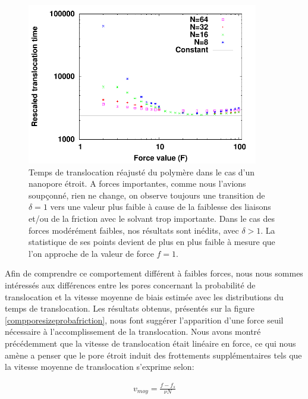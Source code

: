 \begin{figure}[H]
\begin{center}
\includegraphics[width=0.9\textwidth]{sptransloctaufresc.pdf}
\caption[Temps de translocations réajustés (avec $\alpha=1.73$) du polymère structuré et pore étroit]{Temps de translocation réajusté du polymère dans le cas d'un nanopore étroit. A forces importantes, comme nous l'avions soupçonné, rien ne change, on observe toujours une transition de $\delta=1$ vers une valeur plus faible à cause de la faiblesse des liaisons et/ou de la friction avec le solvant trop importante. Dans le cas des forces modérément faibles, nos résultats sont inédits, avec $\delta>1$. La statistique de ses points devient de plus en plus faible à mesure que l'on approche de la valeur de force $f=1$.}
\label{sptransloctaufresc}
\end{center}
\end{figure}

Afin de comprendre ce comportement différent à faibles forces, nous nous sommes intéressés aux différences entre les pores concernant la probabilité de translocation et la vitesse moyenne de biais estimée avec les distributions du temps de translocation. Les résultats obtenus, présentés sur la figure \ref{compporesizeprobafriction}, nous font suggérer l'apparition d'une force seuil nécessaire à l'accomplissement de la translocation. Nous avons montré précédemment que la vitesse de translocation était linéaire en force, ce qui nous amène a penser que le pore étroit induit des frottements supplémentaires tels que la vitesse moyenne de translocation s'exprime selon:

\begin{center}
\begin{eqnarray}
v_{moy}=\frac{f- f_s}{\nu N}
\end{eqnarray}
\end{center}



